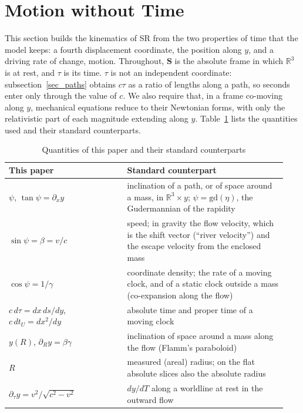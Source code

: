 \documentclass{iopjournal}
\begin{document}
\section{Motion without Time}\label{sec_motion}

This section builds the kinematics of SR from the two properties of time that the model keeps: a fourth displacement coordinate, the position along $y$, and a driving rate of change, motion. Throughout, $\mathbf{S}$ is the absolute frame in which $\mathbb{R}^3$ is at rest, and $\tau$ is its time. $\tau$ is not an independent coordinate: subsection~\ref{sec_paths} obtains $c\tau$ as a ratio of lengths along a path, so seconds enter only through the value of $c$. We also require that, in a frame co-moving along $y$, mechanical equations reduce to their Newtonian forms, with only the relativistic part of each magnitude extending along $y$. Table~\ref{table_dictionary} lists the quantities used and their standard counterparts.

\begin{table}[h]
\caption{Quantities of this paper and their standard counterparts}%
\label{table_dictionary}
\begin{tabular}{@{}p{0.40\linewidth}p{0.54\linewidth}@{}}
\toprule
This paper & Standard counterpart\\
\midrule
$\psi$, $\tan\psi=\partial_x y$ & inclination of a path, or of space around a mass, in $\mathbb{R}^3\times y$; $\psi=\mathrm{gd}(\eta)$, the Gudermannian of the rapidity\\
$\sin\psi=\beta=v/c$ & speed; in gravity the flow velocity, which is the shift vector (``river velocity'') and the escape velocity from the enclosed mass\\
$\cos\psi=1/\gamma$ & coordinate density; the rate of a moving clock, and of a static clock outside a mass (co-expansion along the flow)\\
$c\,d\tau=dx\,ds/dy$, $c\,dt_U=dx^2/dy$ & absolute time and proper time of a moving clock\\
$y(R)$, $\partial_R y=\beta\gamma$ & inclination of space around a mass along the flow (Flamm's paraboloid)\\
$R$ & measured (areal) radius; on the flat absolute slices also the absolute radius\\
$\partial_\tau y=v^2/\sqrt{c^2-v^2}$ & $dy/dT$ along a worldline at rest in the outward flow\\
\bottomrule
\end{tabular}
\end{table}
\end{document}

